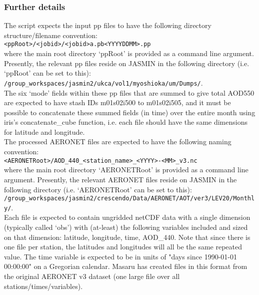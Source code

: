 \documentclass[10pt,a4paper]{article}
\newcommand\tab[1][0.5cm]{\hspace*{#1}}
\begin{document}
\subsubsection{Further details}
The script expects the input pp files to have the following directory structure/filename convention:\\
\tab \texttt{<ppRoot>/<jobid>/<jobid>a.pb<YYYYDDMM>.pp}\\
where the main root directory `ppRoot' is provided as a command line argument. Presently, the relevant pp files reside on JASMIN in the following directory (i.e. `ppRoot' can be set to this):\\
\tab \texttt{/group\_workspaces/jasmin2/ukca/vol1/myoshioka/um/Dumps/}.\\
The six `mode' fields within these pp files that are summed to give total AOD550 are expected to have stash IDs m01s02i500 to m01s02i505, and it must be possible to concatenate these summed fields (in time) over the entire month using iris's concatenate\_cube function, i.e. each file should have the same dimensions for latitude and longitude.\\

\noindent The processed AERONET files are expected to have the following naming convention:\\
\tab \texttt{<AERONETRoot>/AOD\_440\_<station\_name>\_<YYYY>-<MM>\_v3.nc}\\
where the main root directory `AERONETRoot' is provided as a command line argument. Presently, the relevant AERONET files reside on JASMIN in the following directory (i.e. `AERONETRoot' can be set to this):\\
\tab \texttt{/group\_workspaces/jasmin2/crescendo/Data/AERONET/AOT/ver3/LEV20/Monthly/}.\\
Each file is expected to contain ungridded netCDF data with a single dimension (typically called `obs') with (at-least) the following variables included and sized on that dimension: latitude, longitude, time, AOD\_440. Note that since there is one file per station, the latitudes and longitudes will all be the same repeated value. The time variable is expected to be in units of "days since 1990-01-01 00:00:00" on a Gregorian calendar. Masaru has created files in this format from the original AERONET v3 dataset (one large file over all stations/times/variables).\\
\end{document}
